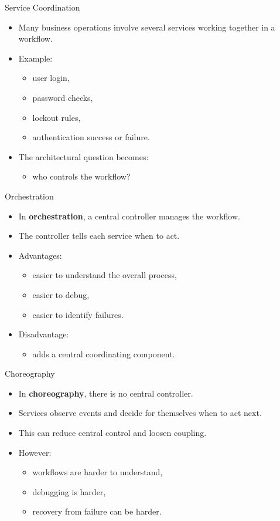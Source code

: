 \begin{frame}{Service Coordination}
\begin{itemize}
    \item Many business operations involve several services working together in a workflow.
    \item Example:
    \begin{itemize}
        \item user login,
        \item password checks,
        \item lockout rules,
        \item authentication success or failure.
    \end{itemize}
    \item The architectural question becomes:
    \begin{itemize}
        \item who controls the workflow?
    \end{itemize}
\end{itemize}
\end{frame}

\begin{frame}{Orchestration}
\begin{itemize}
    \item In \textbf{orchestration}, a central controller manages the workflow.
    \item The controller tells each service when to act.
    \item Advantages:
    \begin{itemize}
        \item easier to understand the overall process,
        \item easier to debug,
        \item easier to identify failures.
    \end{itemize}
    \item Disadvantage:
    \begin{itemize}
        \item adds a central coordinating component.
    \end{itemize}
\end{itemize}
\end{frame}

\begin{frame}{Choreography}
\begin{itemize}
    \item In \textbf{choreography}, there is no central controller.
    \item Services observe events and decide for themselves when to act next.
    \item This can reduce central control and loosen coupling.
    \item However:
    \begin{itemize}
        \item workflows are harder to understand,
        \item debugging is harder,
        \item recovery from failure can be harder.
    \end{itemize}
\end{itemize}
\end{frame}

